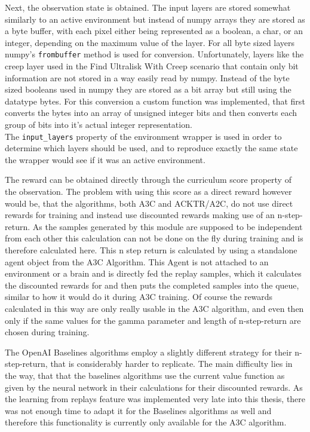 Next, the observation state is obtained. The input layers are stored somewhat similarly to an active environment but instead of numpy arrays they are stored as a byte buffer, with each pixel either being represented as a boolean, a char, or an integer, depending on the maximum value of the layer. For all byte sized layers numpy's \lstinline{frombuffer} method is used for conversion. Unfortunately, layers like the creep layer used in the Find Ultralisk With Creep scenario that contain only bit information are not stored in a way easily read by numpy. Instead of the byte sized booleans used in numpy they are stored as a bit array but still using the datatype bytes. For this conversion a custom function was implemented, that first converts the bytes into an array of unsigned integer bits and then converts each group of bits into it's actual integer representation. \\
The \lstinline{input_layers} property of the environment wrapper is used in order to determine which layers should be used, and to reproduce exactly the same state the wrapper would see if it was an active environment.

The reward can be obtained directly through the curriculum score property of the observation. The problem with using this score as a direct reward however would be, that the algorithms, both A3C and ACKTR/A2C, do not use direct rewards for training and instead use discounted rewards making use of an n-step-return. As the samples generated by this module are supposed to be independent from each other this calculation can not be done on the fly during training and is therefore calculated here. This n step return is calculated by using a standalone agent object from the A3C Algorithm. This Agent is not attached to an environment or a brain and is directly fed the replay samples, which it calculates the discounted rewards for and then puts the completed samples into the queue, similar to how it would do it during A3C training. Of course the rewards calculated in this way are only really usable in the A3C algorithm, and even then only if the same values for the gamma parameter and length of n-step-return are chosen during training. 

The OpenAI Baselines algorithms employ a slightly different strategy for their n-step-return, that is considerably harder to replicate. The main difficulty lies in the way, that that the baselines algorithms use the current value function as given by the neural network in their calculations for their discounted rewards. As the learning from replays feature was implemented very late into this thesis, there was not enough time to adapt it for the Baselines algorithms as well and therefore this functionality is currently only available for the A3C algorithm.

